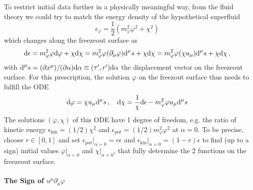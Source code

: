 To restrict initial data further in a physically meaningful way, from the fluid theory we could try to match the energy density of the hypothetical superfluid
\begin{equation}
    \epsilon_\varphi=\frac{1}{2}(m_\varphi^2\varphi^2+\chi^2)
\end{equation}
which changes along the freezeout surface as
    \begin{equation}
        \text{d}\epsilon=m_\varphi^2\varphi\text{d}\varphi+\chi\text{d}\chi=m_\varphi^2\varphi(\partial_\mu\varphi)\text{d}^\mu s+\chi\text{d}\chi=m_\varphi^2\varphi(\chi u_\mu)\text{d}^\mu s+\chi\text{d}\chi\,,
    \end{equation}
with ${\text{d}^\mu s=(\partial x^\mu)/(\partial\alpha)\text{d}\alpha\equiv(\tau^\prime,r^\prime)\text{d}\alpha}$ the displacement vector on the freezeout surface. For this prescription, the solution $\varphi$ on the freezout surface thus needs to fulfill the ODE
\begin{equation}
    \text{d}\varphi=\chi u_\mu\text{d}^\mu s\,,\quad
    \text{d}\chi=\frac{1}{\chi}\text{d}\epsilon-m_\varphi^2\varphi u_\mu\text{d}^\mu s
    \label{eq:InitialConditions_ODE}
\end{equation}
The solutions $(\varphi,\chi)$ of this ODE have 1 degree of freedom, e.g. the ratio of kinetic energy ${\epsilon_{\text{kin}}=(1/2)\chi^2}$ and ${\epsilon_{\text{pot}}=(1/2)m_\varphi^2\varphi^2}$ at $\alpha=0$. To be precise, choose ${r\in[0,1]}$ and set ${\epsilon_{\text{pot}}\big\vert_{\alpha=0}=r\epsilon}$ and ${\epsilon_{\text{kin}}\big\vert_{\alpha=0}=(1-r)\epsilon}$ to find (up to a sign) initial values $\varphi\vert_{\alpha=0}$ and $\chi\vert_{\alpha=0}$, that fully determine the 2 functions on the freezeout surface.

\paragraph{The Sign of $u^\mu\partial_\mu\varphi$}


